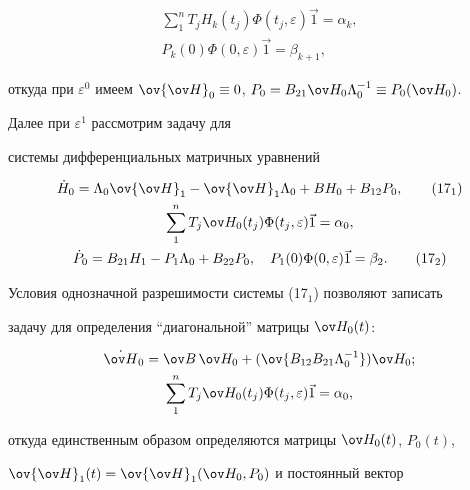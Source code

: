 \begin{gather*} 


\sum^n_1T_j H_k(t_j)\Phi(t_j,\varepsilon)\Vec 1=\alpha_k,\\ 


P_k(0)\Phi(0,\varepsilon)\Vec 1=\beta_{k+1}, 


\end{gather*} 


откуда при $\varepsilon^0$ имеем $\ov{\ov H}_0\equiv0$, $P_0=B_{21}\ov 


H_0\Lambda^{-1}_0\equiv P_0(\ov H_0)$. 


 


Далее при $\varepsilon^1$ рассмотрим задачу для


системы дифференциальных матричных уравнений 


\begin{gather*} 


\Dot H_0=\Lambda_0\ov{\ov H}_1-\ov{\ov H}_1\Lambda_0+ 


B H_0+B_{12}P_0,\tag{17$_1$} \\ 


\sum^n_1T_j\ov H_0(t_j)\Phi(t_j,\varepsilon)\Vec1=\alpha_0,\notag \\ 


\Dot P_0=B_{21}H_1-P_1\Lambda_0+B_{22}P_0,\quad 


P_1(0)\Phi(0,\varepsilon)\Vec 1=\beta_2.\tag{17$_2$} 


\end{gather*} 


 


Условия однозначной разрешимости системы (17$_1$) позволяют записать 


задачу для определения ``диагональной'' матрицы $\ov H_0(t)$: 


\begin{gather*} 


\Dot{\ov H}_0=\ov B \,


\ov H_0+(\ov{B_{12}B_{21}\Lambda^{-1}_0})\ov H_0;\\ 


\sum^n_1T_j\ov H_0(t_j)\Phi(t_j,\varepsilon)\Vec 1=\alpha_0, 


\end{gather*} 


откуда единственным образом определяются матрицы $\ov H_0(t)$, $P_0(t)$, 


$\ov{\ov H}_1(t)=\ov{\ov H}_1(\ov H_0,P_0)$ и постоянный вектор 


